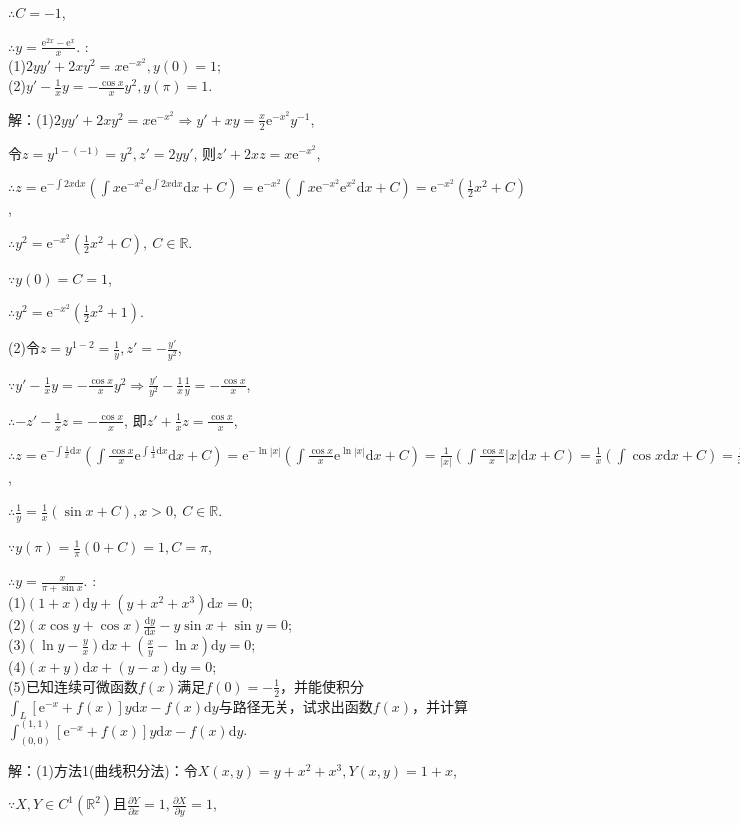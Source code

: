 \documentclass[12pt,UTF8,fleqn]{ctexart}
\newcommand{\md}[1]{\mathrm d#1}
\newcommand{\ppx}[1]{\frac{\partial #1}{\partial x}}
\newcommand{\ppy}[1]{\frac{\partial #1}{\partial y}}
\newcommand{\me}[0]{\mathrm e}
\begin{document}
\begin{enumerate}
$\therefore C=-1$,

$\therefore y=\frac{\me^{2x}-\me^x}x$.
:\\
(1)$2yy'+2xy^2=x\me^{-x^2},y(0)=1$;\\
(2)$y'-\frac1xy=-\frac{\cos x}xy^2,y(\pi)=1$.

解：(1)$2yy'+2xy^2=x\me^{-x^2}\Rightarrow y'+xy=\frac x2\me^{-x^2}y^{-1}$,

令$z=y^{1-(-1)}=y^2,z'=2yy'$, 则$z'+2xz=x\me^{-x^2}$,

$\therefore z=\me^{-\int2x\md x}(\int x\me^{-x^2}\me^{\int2x\md x}\md x+C)=\me^{-x^2}(\int x\me^{-x^2}\me^{x^2}\md x+C)=\me^{-x^2}(\frac12x^2+C)$,

$\therefore y^2=\me^{-x^2}(\frac12x^2+C),\ C\in\mathbb R$.

$\because y(0)=C=1$,

$\therefore y^2=\me^{-x^2}(\frac12x^2+1)$.

(2)令$z=y^{1-2}=\frac1y,z'=-\frac{y'}{y^2}$,

$\because y'-\frac1xy=-\frac{\cos x}xy^2\Rightarrow \frac{y'}{y^2}-\frac1x\frac1y=-\frac{\cos x}x$,

$\therefore -z'-\frac1xz=-\frac{\cos x}x$, 即$z'+\frac1xz=\frac{\cos  x}x$,

$\therefore z=\me^{-\int\frac1x\md x}(\int\frac{\cos x}x\me^{\int\frac1x\md x}\md x+C)=\me^{-\ln|x|}(\int\frac{\cos x}x\me^{\ln|x|}\md x+C)=\frac1{|x|}(\int\frac{\cos x}x|x|\md x+C)=\frac1x(\int\cos x\md x+C)=\frac1x(\sin x+C),x>0$,

$\therefore\frac1y=\frac1x(\sin x+C),x>0,\ C\in\mathbb R$.

$\because y(\pi)=\frac1\pi(0+C)=1,C=\pi$,

$\therefore y=\frac x{\pi+\sin x}$.
:\\
(1)$(1+x)\md y+(y+x^2+x^3)\md x=0$;\\
(2)$(x\cos y+\cos x)\frac{\md y}{\md x}-y\sin x+\sin y=0$;\\
(3)$(\ln y-\frac yx)\md x+(\frac xy-\ln x)\md y=0$;\\
(4)$(x+y)\md x+(y-x)\md y=0$;\\
(5)已知连续可微函数$f(x)$满足$f(0)=-\frac12$，并能使积分$\int_L[\me^{-x}+f(x)]y\md x-f(x)\md y$与路径无关，试求出函数$f(x)$，并计算$\int_{(0,0)}^{(1,1)}[\me^{-x}+f(x)]y\md x-f(x)\md y$.

解：(1)方法1(曲线积分法)：令$X(x,y)=y+x^2+x^3,Y(x,y)=1+x$,

$\because X,Y\in C^1(\mathbb R^2)$且$\ppx{Y}=1,\ppy{X}=1$,


\end{enumerate}
\end{document}
